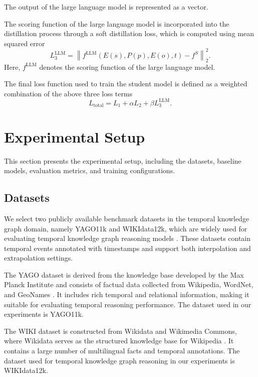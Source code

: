 \documentclass[11pt]{article}
\begin{document}
The output of the large language model is represented as a vector.

The scoring function of the large language model is incorporated into the distillation process through a soft distillation loss, which is computed using mean squared error
\begin{equation}
L^{\text{LLM}}_3 = \left\| f^{\text{LLM}}(E(s), P(p), E(o), t) - f^S \right\|_2^2 .
\end{equation}
Here, $f^{\text{LLM}}$ denotes the scoring function of the large language model.

The final loss function used to train the student model is defined as a weighted combination of the above three loss terms
\begin{equation}
L_{\text{total}} = L_1 + \alpha L_2 + \beta L^{\text{LLM}}_3 .
\end{equation}

\section{Experimental Setup}

This section presents the experimental setup, including the datasets, baseline models, evaluation metrics, and training configurations.

\subsection{Datasets}

We select two publicly available benchmark datasets in the temporal knowledge graph domain, namely YAGO11k and WIKIdata12k, which are widely used for evaluating temporal knowledge graph reasoning models \citep{leblay2018deriving, garcia2020temporal}. These datasets contain temporal events annotated with timestamps and support both interpolation and extrapolation settings.

The YAGO dataset is derived from the knowledge base developed by the Max Planck Institute and consists of factual data collected from Wikipedia, WordNet, and GeoNames \citep{mahdisoltani2015yago3}. It includes rich temporal and relational information, making it suitable for evaluating temporal reasoning performance. The dataset used in our experiments is YAGO11k.

The WIKI dataset is constructed from Wikidata and Wikimedia Commons, where Wikidata serves as the structured knowledge base for Wikipedia \citep{vrandevcic2014wikidata}. It contains a large number of multilingual facts and temporal annotations. The dataset used for temporal knowledge graph reasoning in our experiments is WIKIdata12k.
\end{document}

